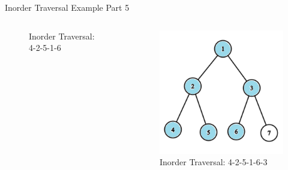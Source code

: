 \documentclass[aspectratio=169]{beamer}%
\begin{document}
\begin{frame}{Inorder Traversal Example Part 5}
\begin{columns}
\begin{column}{0.32\textwidth}
\begin{figure}
                \caption{Inorder Traversal: 4-2-5-1-6}
            \end{figure}
        \end{column}
        \hfill
        \begin{column}{0.32\textwidth}
            \begin{figure}
                \centering
                \includegraphics[width = .9\linewidth]{tree-in 15.png}
                \caption{Inorder Traversal: 4-2-5-1-6-3}
            \end{figure}
        \end{column}
    \end{columns}
\end{frame}
\end{document}
